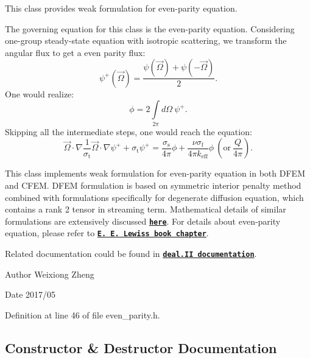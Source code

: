 This class provides weak formulation for even-\/parity equation. 

The governing equation for this class is the even-\/parity equation. Considering one-\/group steady-\/state equation with isotropic scattering, we transform the angular flux to get a even parity flux\+: \[ \psi^+\left(\vec{\Omega}\right)=\frac{\psi\left(\vec{\Omega}\right)+ \psi\left(-\vec{\Omega}\right)}{2}. \] One would realize\+: \[ \phi=2\int\limits_{2\pi}d\Omega\ \psi^+. \] Skipping all the intermediate steps, one would reach the equation\+: \[ \vec{\Omega}\cdot\nabla\frac{1}{\sigma_\mathrm{t}}\vec{\Omega}\cdot\nabla\psi^+ + \sigma_\mathrm{t}\psi^+= \frac{\sigma_\mathrm{s}}{4\pi}\phi + \frac{\nu\sigma_\mathrm{f}}{4\pi k_\mathrm{eff}}\phi\ (\mathrm{or}\ \frac{Q}{4\pi}). \]

This class implements weak formulation for even-\/parity equation in both D\+F\+EM and C\+F\+EM. D\+F\+EM formulation is based on symmetric interior penalty method combined with formulations specifically for degenerate diffusion equation, which contains a rank 2 tensor in streaming term. Mathematical details of similar formulations are extensively discussed \href{http://epubs.siam.org/doi/abs/1
0.1137/S0036142900374111}{\tt {\bfseries here}}. For details about even-\/parity equation, please refer to \href{http://www.springer.com/cda/cont
ent/document/cda_downloaddocument/9789048134106-c2.pdf?SGWID=0-0-45-1125054-p17
3921104}{\tt {\bfseries E. E. Lewis\textquotesingle{}s book chapter}}.

Related documentation could be found in \href{https://www.dealii.org/8.5.0/
doxygen/deal.II/}{\tt {\bfseries deal.\+II documentation}}.

\begin{DoxyAuthor}{Author}
Weixiong Zheng 
\end{DoxyAuthor}
\begin{DoxyDate}{Date}
2017/05 
\end{DoxyDate}


Definition at line 46 of file even\+\_\+parity.\+h.



\subsection{Constructor \& Destructor Documentation}
\mbox{\label{class_even_parity_a2877e7e239900be85cc84471fe670abd}} 
